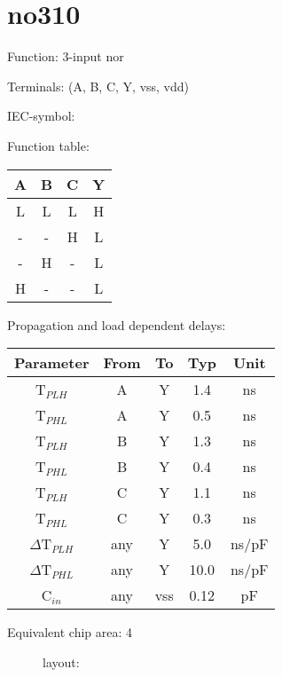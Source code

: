 \section{no310}

Function: 3-input nor

Terminals: (A, B, C, Y, vss, vdd)


IEC-symbol:
\begin{figure}[bth]
\end{figure}

Function table:
\begin{table}[bth]
\begin{tabular}{|c|c|c||c|}
\hline
A	&B	&C	&Y\\
\hline
L	&L	&L	&H\\
-	&-	&H	&L\\
-	&H	&-	&L\\
H	&-	&-	&L\\
\hline
\end{tabular}
\vspace{1cm}

Propagation and load dependent delays:\\

\begin{tabular}{|c|c|c|c|c|}
\hline
Parameter               &From            &To   &Typ    &Unit\\
\hline
T$_{PLH}$               &A     		&Y      &1.4    &ns\\
T$_{PHL}$               &A    		&Y      &0.5    &ns\\
T$_{PLH}$               &B     		&Y      &1.3    &ns\\
T$_{PHL}$               &B    		&Y      &0.4    &ns\\
T$_{PLH}$               &C     		&Y      &1.1    &ns\\
T$_{PHL}$               &C    		&Y      &0.3    &ns\\
\hline
$\Delta$T$_{PLH}$       &any          	&Y      &5.0    &ns/pF\\
$\Delta$T$_{PHL}$       &any           	&Y      &10.0    &ns/pF\\
\hline
C$_{in}$                &any	    	&vss    &0.12   &pF\\
\hline
\end{tabular}
\end{table}


Equivalent chip area: 4





\begin{figure}[bth]
layout:\\

\end{figure}


\clearpage
